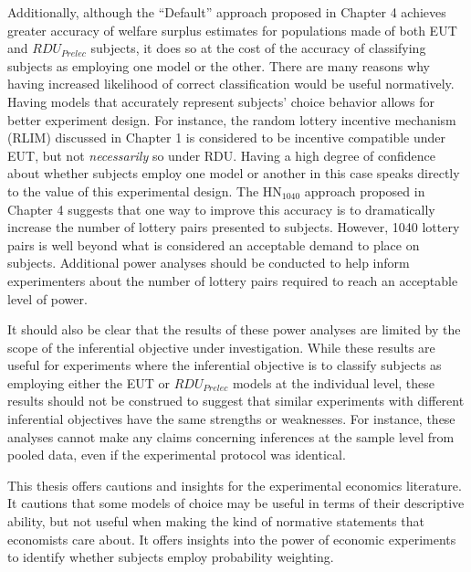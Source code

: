 \documentclass[../main.tex]{subfiles}
\begin{document}
Additionally, although the \enquote{Default} approach proposed in Chapter 4 achieves greater accuracy of welfare surplus estimates for populations made of both EUT and $\mathit{RDU_{Prelec}}$ subjects, it does so at the cost of the accuracy of classifying subjects as employing one model or the other.
There are many reasons why having increased likelihood of correct classification would be useful normatively.
Having models that accurately represent subjects' choice behavior allows for better experiment design.
For instance, the random lottery incentive mechanism (RLIM) discussed in Chapter 1 is considered to be incentive compatible under EUT, but not \textit{necessarily} so under RDU.
Having a high degree of confidence about whether subjects employ one model or another in this case speaks directly to the value of this experimental design.
The $\text{HN}_{1040}$ approach proposed in Chapter 4 suggests that one way to improve this accuracy is to dramatically increase the number of lottery pairs presented to subjects.
However, 1040 lottery pairs is well beyond what is considered an acceptable demand to place on subjects.
Additional power analyses should be conducted to help inform experimenters about the number of lottery pairs required to reach an acceptable level of power.

It should also be clear that the results of these power analyses are limited by the scope of the inferential objective under investigation.
While these results are useful for experiments where the inferential objective is to classify subjects as employing either the EUT or $\mathit{RDU_{Prelec}}$ models at the individual level, these results should not be construed to suggest that similar experiments with different inferential objectives have the same strengths or weaknesses.
For instance, these analyses cannot make any claims concerning inferences at the sample level from pooled data, even if the experimental protocol was identical.

This thesis offers cautions and insights for the experimental economics literature.
It cautions that some models of choice may be useful in terms of their descriptive ability, but not useful when making the kind of normative statements that economists care about.
It offers insights into the power of economic experiments to identify whether subjects employ probability weighting.

\onlyinsubfile{
\newpage
\printbibliography[segment=5, heading=subbibliography]
}
\end{document}
